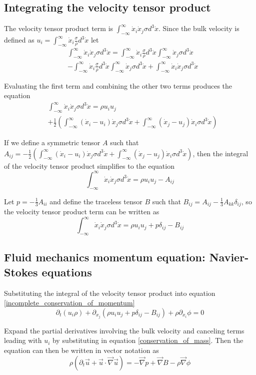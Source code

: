 \documentclass[%
 reprint,
 amsmath,amssymb,
 aps,
]{revtex4-1}
\newcommand{\grad}{\vec{\nabla}}
\newcommand{\intVdot}[1]{\int_{-\infty}^{\infty} #1 d^3\dot{x}}
\begin{document}
\subsection{Integrating the velocity tensor product}
The velocity tensor product term is $\intVdot{\dot{x}_i\dot{x}_j\sigma}$. Since the bulk velocity is defined as $u_i=\intVdot{\dot{x}_i\frac{\sigma}{\rho}}$ let
\[
\begin{split}
& \intVdot{\dot{x}_i\dot{x}_j\sigma}=\intVdot{\dot{x}_i\frac{\sigma}{\rho}}\intVdot{\dot{x}_j\sigma} \\ & - \intVdot{\dot{x}_i\frac{\sigma}{\rho}}\intVdot{\dot{x}_j\sigma} + \intVdot{\dot{x}_i\dot{x}_j\sigma}
\end{split}
\]

Evaluating the first term and combining the other two terms produces the equation
\[
\begin{split}
& \intVdot{\dot{x}_i\dot{x}_j\sigma}=\rho u_i u_j \\ & + \frac{1}{2}\left(\intVdot{\left(\dot{x}_i - u_i\right)\dot{x}_j\sigma} + \intVdot{\left(\dot{x}_j - u_j\right)\dot{x}_i\sigma}\right)
\end{split}
\]

If we define a symmetric tensor $A$ such that $A_{ij} = -\frac{1}{2}\left(\intVdot{\left(\dot{x}_i - u_i\right)\dot{x}_j\sigma} + \intVdot{\left(\dot{x}_j - u_j\right)\dot{x}_i\sigma}\right)$, then the integral of the velocity tensor product simplifies to the equation
\[
\intVdot{\dot{x}_i\dot{x}_j\sigma}=\rho u_i u_j - A_{ij}
\]

Let $p=-\frac{1}{3}A_{ii}$ and define the traceless tensor $B$ such that $B_{ij}=A_{ij}-\frac{1}{3}A_{kk}\delta_{ij}$, so the velocity tensor product term can be written as
\[
\intVdot{\dot{x}_i\dot{x}_j\sigma}=\rho u_i u_j + p\delta_{ij} - B_{ij}
\]

\subsection{Fluid mechanics momentum equation: Navier-Stokes equations}
Substituting the integral of the velocity tensor product into equation \eqref{incomplete_conservation_of_momentum}
\[
\partial_t\left(u_i\rho\right) + \partial_{x_j}\left(\rho u_i u_j + p\delta_{ij}-B_{ij}\right) + \rho\partial_{x_i}\phi=0
\]

Expand the partial derivatives involving the bulk velocity and canceling terms leading with $u_i$ by substituting in equation \eqref{conservation_of_mass}. Then the equation can then be written in vector notation as
\begin{equation}
\rho\left(\partial_t \vec{u} + \vec{u}\cdot\grad\vec{u}\right) = - \grad p + \grad B - \rho\grad\phi
\label{conservation_of_momentum}
\end{equation}
\end{document}
